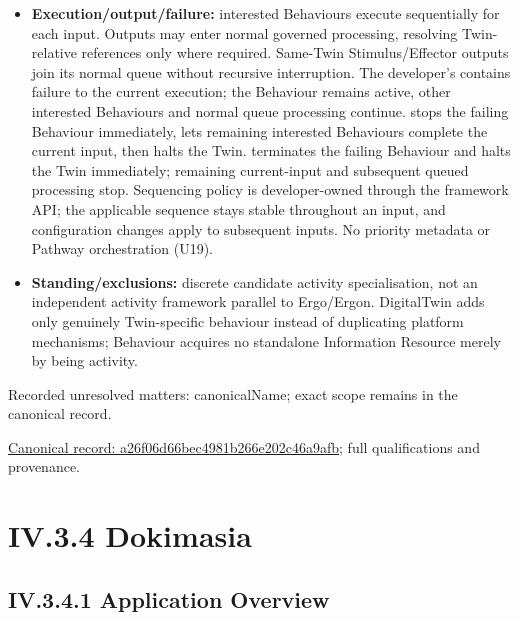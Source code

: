 \begin{itemize}
\item \textbf{Execution/output/failure:} interested Behaviours execute sequentially for
  each input. Outputs may enter normal governed processing, resolving Twin-relative
  references only where required. Same-Twin Stimulus/Effector outputs join its
  normal queue without recursive interruption. The developer's
  \texttt{} contains failure to the current execution; the
  Behaviour remains active, other interested Behaviours and normal queue processing
  continue. \texttt{} stops the failing Behaviour immediately,
  lets remaining interested Behaviours complete the current input, then halts
  the Twin. \texttt{} terminates the failing Behaviour and halts
  the Twin immediately; remaining current-input and subsequent queued processing
  stop. Sequencing policy is developer-owned through the framework API; the
  applicable sequence stays stable throughout an input, and configuration changes
  apply to subsequent inputs. No priority metadata or Pathway orchestration (U19).

\item \textbf{Standing/exclusions:} discrete candidate activity specialisation, not an
  independent activity framework parallel to Ergo/Ergon. DigitalTwin adds only
  genuinely Twin-specific behaviour instead of duplicating platform mechanisms;
  Behaviour acquires no standalone Information Resource merely by being activity.

\end{itemize}

{\small Recorded unresolved matters: canonicalName; exact scope remains in the canonical record.}\par
{\footnotesize \href{../../../../continuum/application/application-component/a26f06d66bec4981b266e202c46a9afb.md}{Canonical record: a26f06d66bec4981b266e202c46a9afb}; full qualifications and provenance.}\par
\section*{IV.3.4 Dokimasia}
\label{navigation:IV.3.4}

\subsection*{IV.3.4.1 Application Overview}
\label{navigation:IV.3.4.1}


